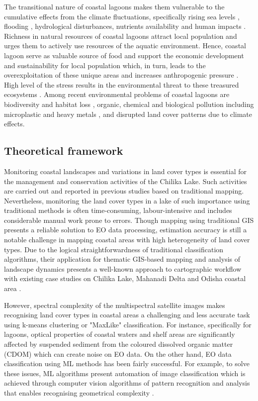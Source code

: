 \documentclass[jmse,article,submit,pdftex,moreauthors]{Definitions/mdpi}
\begin{document}
The transitional nature of coastal lagoons makes them vulnerable to the cumulative effects from the climate fluctuations, specifically rising sea levels \cite{CARRASCO2016356}, flooding \cite{INACIO2023100491}, hydrological disturbances, nutrients availability \cite{LUNARDINI2000135} and human impacts \cite{Luglie}. Richness in natural resources of coastal lagoons attract local population and urges them to actively use resources of the aquatic environment. Hence, coastal lagoon serve as valuable source of food and support the economic development and sustainability for local population which, in turn, leads to the overexploitation of these unique areas and increases anthropogenic pressure \cite{PAULY1994377}. High level of the stress results in the environmental threat to these treasured ecosystems \cite{Davis}. Among recent environmental problems of coastal lagoons are biodiversity and habitat loss \cite{Kumari2022},  organic, chemical and biological pollution including microplastic \cite{GARCESORDONEZ2022120366,BRUSCHI2023110596} and heavy metals \cite{Tripathi2022}, and disrupted land cover patterns due to climate effects. 

\subsection{Theoretical framework}
Monitoring coastal landscapes and variations in land cover types is essential for the management and conservation activities of the Chilika Lake. Such activities are carried out and reported in previous studies based on traditional mapping. Nevertheless, monitoring the land cover types in a lake of such importance using traditional methods is often time-consuming, labour-intensive and includes considerable manual work prone to errors. Though mapping using traditional GIS presents a reliable solution to EO data processing, estimation accuracy is still a notable challenge in mapping coastal areas with high heterogeneity of land cover types. Due to the logical straightforwardness of traditional classification algorithms, their application for thematic GIS-based mapping and analysis of landscape dynamics presents a well-known approach to cartographic workflow with existing case studies on Chilika Lake, Mahanadi Delta and Odisha coastal area \cite{G2019595,MISHRA2023162488,REDDY2014287,HAZRA2022100223}. 

However, spectral complexity of the multispectral satellite images makes recognising land cover types in coastal areas a challenging and less accurate task using k-means clustering or "MaxLike" classification. For instance, specifically for lagoons, optical properties of coastal waters and shelf areas are significantly affected by suspended sediment from the coloured dissolved organic matter (CDOM) which can create noise on EO data. On the other hand, EO data classification using ML methods has been fairly successful. For example, to solve these issues, ML algorithms present automation of image classification \cite{6049966,9297369} which is achieved through computer vision algorithms of pattern recognition and analysis that enables recognising geometrical complexity \cite{990132}. 
\end{document}
